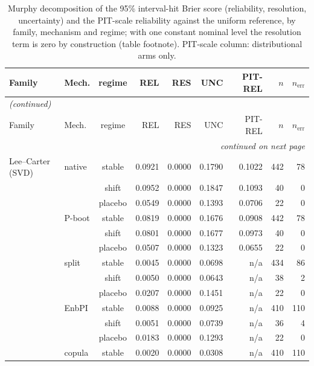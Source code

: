 {\footnotesize\setlength{\tabcolsep}{2pt}
\begin{longtable}{@{}llcrrrrrr@{}}
\caption{Murphy decomposition of the 95\% interval-hit Brier score (reliability, resolution, uncertainty) and the PIT-scale reliability against the uniform reference, by family, mechanism and regime; with one constant nominal level the resolution term is zero by construction (table footnote). PIT-scale column: distributional arms only.}\label{tab:murphy} \\
\toprule
Family & Mech. & regime & REL & RES & UNC & PIT-REL & $n$ & $n_{\mathrm{err}}$ \\
\midrule
\endfirsthead
\multicolumn{9}{l}{\emph{(continued)}} \\
\toprule
Family & Mech. & regime & REL & RES & UNC & PIT-REL & $n$ & $n_{\mathrm{err}}$ \\
\midrule
\endhead
\midrule \multicolumn{9}{r}{\emph{continued on next page}} \\
\endfoot
\bottomrule
\endlastfoot
Lee--Carter (SVD) & native & stable & 0.0921 & 0.0000 & 0.1790 & 0.1022 & 442 & 78 \\
 &  & shift & 0.0952 & 0.0000 & 0.1847 & 0.1093 & 40 & 0 \\
 &  & placebo & 0.0549 & 0.0000 & 0.1393 & 0.0706 & 22 & 0 \\
 & P-boot & stable & 0.0819 & 0.0000 & 0.1676 & 0.0908 & 442 & 78 \\
 &  & shift & 0.0801 & 0.0000 & 0.1677 & 0.0973 & 40 & 0 \\
 &  & placebo & 0.0507 & 0.0000 & 0.1323 & 0.0655 & 22 & 0 \\
 & split & stable & 0.0045 & 0.0000 & 0.0698 & n/a & 434 & 86 \\
 &  & shift & 0.0050 & 0.0000 & 0.0643 & n/a & 38 & 2 \\
 &  & placebo & 0.0207 & 0.0000 & 0.1451 & n/a & 22 & 0 \\
 & EnbPI & stable & 0.0088 & 0.0000 & 0.0925 & n/a & 410 & 110 \\
 &  & shift & 0.0051 & 0.0000 & 0.0739 & n/a & 36 & 4 \\
 &  & placebo & 0.0183 & 0.0000 & 0.1293 & n/a & 22 & 0 \\
 & copula & stable & 0.0020 & 0.0000 & 0.0308 & n/a & 410 & 110 \\

\end{longtable}}
